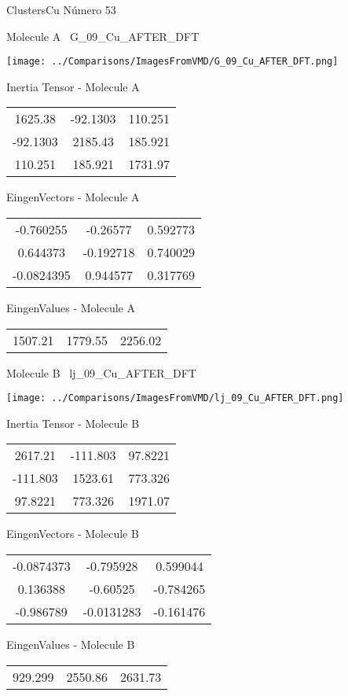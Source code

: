 \vtab[-3cm]
\begin{center}
{\large ClustersCu \tab Número 53}
\end{center}
\begin{multicols}{2}
\begin{center}

Molecule A \
G\_09\_Cu\_AFTER\_DFT

\texttt{[image: ../Comparisons/ImagesFromVMD/G\_09\_Cu\_AFTER\_DFT.png]}

Inertia Tensor - Molecule A \\
\begin{tabular}{|c c c|}
1625.38	 & 	-92.1303	 & 	110.251	 \\
-92.1303	 & 	2185.43	 & 	185.921	 \\
110.251	 & 	185.921	 & 	1731.97
\end{tabular}

\vtab
 EingenVectors - Molecule A     \\
\begin{tabular}{|c c c|}
-0.760255	 & 	-0.26577	 & 	0.592773	 \\
0.644373	 & 	-0.192718	 & 	0.740029	 \\
-0.0824395	 & 	0.944577	 & 	0.317769
\end{tabular}

\vtab
 EingenValues - Molecule A     \\
\begin{tabular}{|c c c|}
1507.21	 & 	1779.55	 & 	2256.02	 \\
\end{tabular}
\columnbreak

Molecule B \
lj\_09\_Cu\_AFTER\_DFT

\texttt{[image: ../Comparisons/ImagesFromVMD/lj\_09\_Cu\_AFTER\_DFT.png]}

Inertia Tensor - Molecule B \\
\begin{tabular}{|c c c|}
2617.21	 & 	-111.803	 & 	97.8221	 \\
-111.803	 & 	1523.61	 & 	773.326	 \\
97.8221	 & 	773.326	 & 	1971.07
\end{tabular}

\vtab
 EingenVectors - Molecule B     \\
\begin{tabular}{|c c c|}
-0.0874373	 & 	-0.795928	 & 	0.599044	 \\
0.136388	 & 	-0.60525	 & 	-0.784265	 \\
-0.986789	 & 	-0.0131283	 & 	-0.161476
\end{tabular}

\vtab
 EingenValues - Molecule B     \\
\begin{tabular}{|c c c|}
929.299	 & 	2550.86	 & 	2631.73	 \\
\end{tabular}

\end{center}
\end{multicols}

